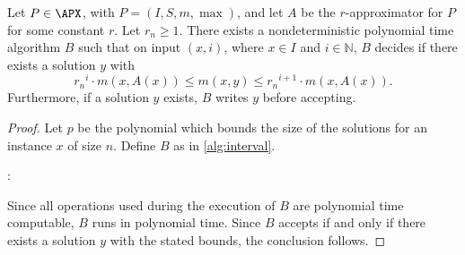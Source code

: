 \documentclass[]{article}
\begin{document}
\begin{lemma}\label{lem:interval}
  Let $P \in \APX$, with $P = (I, S, m, \max)$, and let $A$ be the $r$-approximator for $P$ for some constant $r$.
  Let $r_n \geq 1$.
  There exists a nondeterministic polynomial time algorithm $B$ such that on input $(x, i)$, where $x \in I$ and $i \in \mathbb{N}$, $B$ decides if there exists a solution $y$ with
  \begin{equation*}
    {r_n}^i \cdot m(x, A(x)) \leq m(x, y) \leq {r_n}^{i + 1} \cdot m(x, A(x)).
  \end{equation*}
  Furthermore, if a solution $y$ exists, $B$ writes $y$ before accepting.
\end{lemma}
\begin{proof}
  Let $p$ be the polynomial which bounds the size of the solutions for an instance $x$ of size $n$.
  Define $B$ as in \autoref{alg:interval}.
  \begin{algorithm}
    \caption{Nondeterministic polynomial time algorithm that decides if there is an approximate solution for instance $x$ of problem $P$ in interval $i$%
      \label{alg:interval}}
    \begin{algorithmic}[1]
      \Statex{}
      :
        \Else
        \EndIf
      \EndFunction
    \end{algorithmic}
  \end{algorithm}
  Since all operations used during the execution of $B$ are polynomial time computable, $B$ runs in polynomial time.
  Since $B$ accepts if and only if there exists a solution $y$ with the stated bounds, the conclusion follows.
\end{proof}
\end{document}
